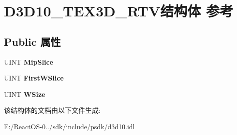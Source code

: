 \hypertarget{struct_d3_d10___t_e_x3_d___r_t_v}{}\section{D3\+D10\+\_\+\+T\+E\+X3\+D\+\_\+\+R\+T\+V结构体 参考}
\label{struct_d3_d10___t_e_x3_d___r_t_v}
\subsection*{Public 属性}
\begin{DoxyCompactItemize}
\item 
\mbox{\label{struct_d3_d10___t_e_x3_d___r_t_v_a471134f79651fc633fbe0c6a0a5c9d6f}} 
U\+I\+NT {\bfseries Mip\+Slice}
\item 
\mbox{\label{struct_d3_d10___t_e_x3_d___r_t_v_a758730851e94c591c33441bc3d56f4af}} 
U\+I\+NT {\bfseries First\+W\+Slice}
\item 
\mbox{\label{struct_d3_d10___t_e_x3_d___r_t_v_a34439a95e85ad6f897339bc32c61b0ad}} 
U\+I\+NT {\bfseries W\+Size}
\end{DoxyCompactItemize}


该结构体的文档由以下文件生成\+:\begin{DoxyCompactItemize}
\item 
E\+:/\+React\+O\+S-\/0../sdk/include/psdk/d3d10.\+idl\end{DoxyCompactItemize}
